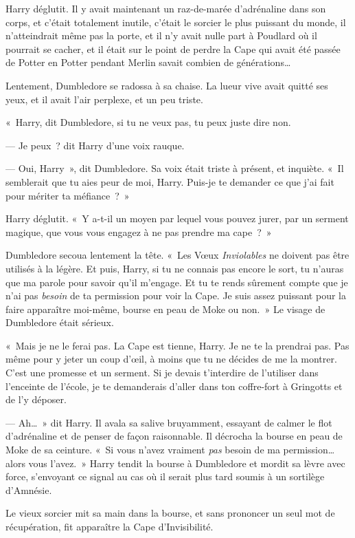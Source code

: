 Harry déglutit. Il y avait maintenant un raz-de-marée d'adrénaline dans son corps, et c'était totalement inutile, c'était le sorcier le plus puissant du monde, il n'atteindrait même pas la porte, et il n'y avait nulle part à Poudlard où il pourrait se cacher, et il était sur le point de perdre la Cape qui avait été passée de Potter en Potter pendant Merlin savait combien de générations…

Lentement, Dumbledore se radossa à sa chaise. La lueur vive avait quitté ses yeux, et il avait l'air perplexe, et un peu triste.

«~Harry, dit Dumbledore, si tu ne veux pas, tu peux juste dire non.

--- Je peux~? dit Harry d'une voix rauque.

--- Oui, Harry~», dit Dumbledore. Sa voix était triste à présent, et inquiète. «~Il semblerait que tu aies peur de moi, Harry. Puis-je te demander ce que j'ai fait pour mériter ta méfiance~?~»

Harry déglutit. «~Y a-t-il un moyen par lequel vous pouvez jurer, par un serment magique, que vous vous engagez à ne pas prendre ma cape~?~»

Dumbledore secoua lentement la tête. «~Les Vœux \emph{Inviolables} ne doivent pas être utilisés à la légère. Et puis, Harry, si tu ne connais pas encore le sort, tu n'auras que ma parole pour savoir qu'il m'engage. Et tu te rends sûrement compte que je n'ai pas \emph{besoin} de ta permission pour voir la Cape. Je suis assez puissant pour la faire apparaître moi-même, bourse en peau de Moke ou non.~» Le visage de Dumbledore était sérieux.

«~Mais je ne le ferai pas. La Cape est tienne, Harry. Je ne te la prendrai pas. Pas même pour y jeter un coup d'œil, à moins que tu ne décides de me la montrer. C'est une promesse et un serment. Si je devais t'interdire de l'utiliser dans l'enceinte de l'école, je te demanderais d'aller dans ton coffre-fort à Gringotts et de l'y déposer.

--- Ah…~» dit Harry. Il avala sa salive bruyamment, essayant de calmer le flot d'adrénaline et de penser de façon raisonnable. Il décrocha la bourse en peau de Moke de sa ceinture. «~Si vous n'avez vraiment \emph{pas} besoin de ma permission… alors vous l'avez.~» Harry tendit la bourse à Dumbledore et mordit sa lèvre avec force, s'envoyant ce signal au cas où il serait plus tard soumis à un sortilège d'Amnésie.

Le vieux sorcier mit sa main dans la bourse, et sans prononcer un seul mot de récupération, fit apparaître la Cape d'Invisibilité.

